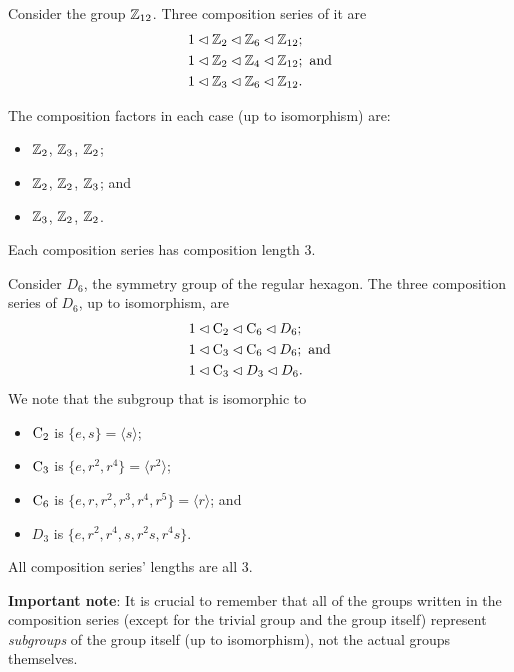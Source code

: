 \begin{example}
    Consider the group $\mathbb{Z}_{12}$. Three composition series of it are
    \begin{align*}
        &1 \lhd \mathbb{Z}_2 \lhd \mathbb{Z}_6 \lhd \mathbb{Z}_{12};\\
        &1 \lhd \mathbb{Z}_2 \lhd \mathbb{Z}_4 \lhd \mathbb{Z}_{12}; \text{ and}\\
        &1 \lhd \mathbb{Z}_3 \lhd \mathbb{Z}_6 \lhd \mathbb{Z}_{12}.
    \end{align*}

    The composition factors in each case (up to isomorphism) are:
    \begin{itemize}
        \item $\mathbb{Z}_2$, $\mathbb{Z}_3$, $\mathbb{Z}_2$;
        \item $\mathbb{Z}_2$, $\mathbb{Z}_2$, $\mathbb{Z}_3$; and
        \item $\mathbb{Z}_3$, $\mathbb{Z}_2$, $\mathbb{Z}_2$.
    \end{itemize}
    Each composition series has composition length 3.
\end{example}

\begin{example}
    Consider $D_6$, the symmetry group of the regular hexagon. The three composition series of $D_6$, up to isomorphism, are
    \begin{align*}
        &1 \lhd \mathrm{C}_{2} \lhd \mathrm{C}_{6} \lhd D_6;\\
        &1 \lhd \mathrm{C}_{3} \lhd \mathrm{C}_{6} \lhd D_6; \text{ and}\\
        &1 \lhd \mathrm{C}_{3} \lhd D_3 \lhd D_6.
    \end{align*}
    We note that the subgroup that is isomorphic to
    \begin{itemize}
        \item $\mathrm{C}_{2}$ is $\{e, s\} = \langle s \rangle$;
        \item $\mathrm{C}_{3}$ is $\{e, r^2, r^4\} = \langle r^2\rangle$;
        \item $\mathrm{C}_{6}$ is $\{e, r, r^2, r^3, r^4, r^5\} = \langle r\rangle$; and
        \item $D_3$ is $\{e, r^2, r^4, s, r^2s, r^4s\}$.
    \end{itemize}
    All composition series' lengths are all 3.
\end{example}
\textbf{Important note}: It is crucial to remember that all of the groups written in the composition series (except for the trivial group and the group itself) represent \textit{subgroups} of the group itself (up to isomorphism), not the actual groups themselves.

